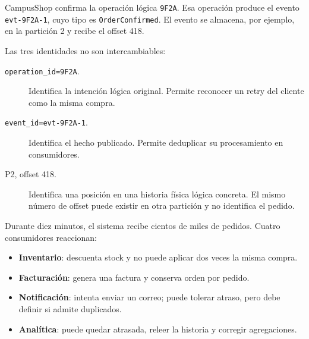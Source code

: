 \documentclass[variant=apuntes,cover=institutional,mode=screen]{ua-engineering-v6-article}
\begin{document}
CampusShop confirma la operación lógica \texttt{9F2A}. Esa operación produce el evento \texttt{evt-9F2A-1}, cuyo tipo es \texttt{OrderConfirmed}. El evento se almacena, por ejemplo, en la partición 2 y recibe el offset 418.

\begin{center}
\end{center}

Las tres identidades no son intercambiables:

\begin{description}
\item[\texttt{operation\_id=9F2A}.] Identifica la intención lógica original. Permite reconocer un retry del cliente como la misma compra.
\item[\texttt{event\_id=evt-9F2A-1}.] Identifica el hecho publicado. Permite deduplicar su procesamiento en consumidores.
\item[P2, offset 418.] Identifica una posición en una historia física lógica concreta. El mismo número de offset puede existir en otra partición y no identifica el pedido.
\end{description}

Durante diez minutos, el sistema recibe cientos de miles de pedidos. Cuatro consumidores reaccionan:

\begin{itemize}
\item \textbf{Inventario}: descuenta stock y no puede aplicar dos veces la misma compra.
\item \textbf{Facturación}: genera una factura y conserva orden por pedido.
\item \textbf{Notificación}: intenta enviar un correo; puede tolerar atraso, pero debe definir si admite duplicados.
\item \textbf{Analítica}: puede quedar atrasada, releer la historia y corregir agregaciones.
\end{itemize}
\end{document}

